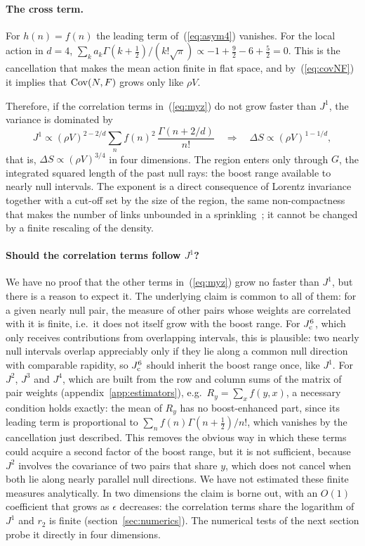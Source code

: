 \documentclass{iopjournal}
\newcommand{\eref}[1]{(\ref{#1})}
\newcommand{\rhoV}{\rho V}
\newcommand{\Jone}{J^{1}}
\begin{document}
\paragraph{The cross term.} For $h(n)=f(n)$ the leading term
of~\eref{eq:asym4} vanishes. For the local action in $d=4$,
$\sum_k a_k\Gamma(k+\frac12)/(k!\sqrt\pi)\propto-1+\frac92-6+\frac52=0$. This is
the cancellation that makes the mean action finite in flat space, and
by~\eref{eq:covNF} it implies that ${\rm Cov}(N,F)$ grows only like $\rhoV$.

\medskip
Therefore, if the correlation terms in~\eref{eq:myz} do not grow faster than
$\Jone$, the variance is dominated by
\begin{equation}
\Jone\propto(\rhoV)^{2-2/d}\sum_n f(n)^2\,\frac{\Gamma(n+2/d)}{n!}
\quad\Longrightarrow\quad
\Delta S\propto(\rhoV)^{1-1/d},
\label{eq:pexp}
\end{equation}
that is, $\Delta S\propto(\rhoV)^{3/4}$ in four dimensions. The region enters
only through $G$, the integrated squared length of the past null rays: the
boost range available to nearly null intervals. The exponent is a direct
consequence of Lorentz invariance together with a cut-off set by the size of
the region, the same non-compactness that makes the number of links unbounded
in a sprinkling~\cite{Bombelli2009}; it cannot be changed by a finite
rescaling of the density.

\paragraph{Should the correlation terms follow $\Jone$?} We have no proof
that the other terms in~\eref{eq:myz} grow no faster than $\Jone$, but there
is a reason to expect it. The underlying claim is common to all of them: for a given nearly null pair,
the measure of other pairs whose weights are correlated with it is finite,
i.e.\ it does not itself grow with the boost range. For $J^6_{\rm c}$, which
only receives contributions from overlapping intervals, this is plausible:
two nearly null intervals overlap appreciably only if they lie along a common
null direction with comparable rapidity, so $J^6_{\rm c}$ should
inherit the boost range once, like $\Jone$. For $J^2$, $J^3$ and $J^4$, which
are built from the row and column sums of the matrix of pair weights
(appendix~\ref{app:estimators}), e.g.\ $R_y=\sum_x f(y,x)$, a necessary
condition holds exactly: the mean of $R_y$ has no boost-enhanced part, since
its leading term is proportional to $\sum_nf(n)\Gamma(n+\frac12)/n!$, which
vanishes by the cancellation just described. This removes the obvious way in
which these terms could acquire a second factor of the boost range, but it is
not sufficient, because $J^2$ involves the covariance of two pairs that share
$y$, which does not cancel when both lie along nearly parallel null directions.
We have not estimated these finite measures analytically. In two dimensions
the claim is borne out, with an $O(1)$ coefficient that grows as $\epsilon$
decreases: the correlation terms share the logarithm of $\Jone$ and $r_2$ is
finite (section~\ref{sec:numerics}). The numerical tests of the next
section probe it directly in four dimensions.
\end{document}
